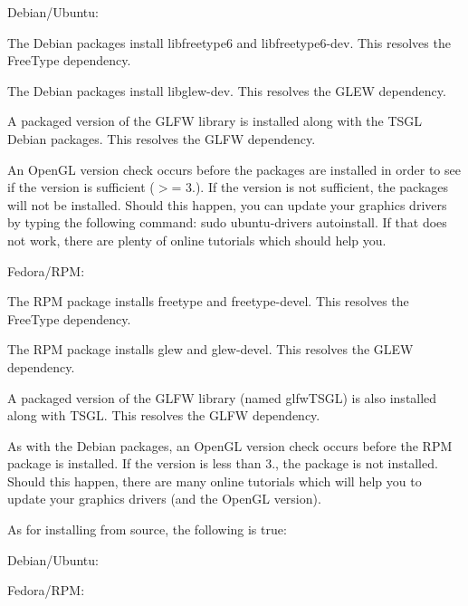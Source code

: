 \begin{DoxyItemize}
\item Debian/\-Ubuntu\-:
\begin{DoxyItemize}
\item The Debian packages install libfreetype6 and libfreetype6-\/dev. This resolves the Free\-Type dependency.
\item The Debian packages install libglew-\/dev. This resolves the G\-L\-E\-W dependency.
\item A packaged version of the G\-L\-F\-W library is installed along with the T\-S\-G\-L Debian packages. This resolves the G\-L\-F\-W dependency.
\item An Open\-G\-L version check occurs before the packages are installed in order to see if the version is sufficient ($>$= 3.). If the version is not sufficient, the packages will not be installed. Should this happen, you can update your graphics drivers by typing the following command\-: {\ttfamily sudo ubuntu-\/drivers autoinstall}. If that does not work, there are plenty of online tutorials which should help you.
\end{DoxyItemize}
\item Fedora/\-R\-P\-M\-:
\begin{DoxyItemize}
\item The R\-P\-M package installs freetype and freetype-\/devel. This resolves the Free\-Type dependency.
\item The R\-P\-M package installs glew and glew-\/devel. This resolves the G\-L\-E\-W dependency.
\item A packaged version of the G\-L\-F\-W library (named glfw\-T\-S\-G\-L) is also installed along with T\-S\-G\-L. This resolves the G\-L\-F\-W dependency.
\item As with the Debian packages, an Open\-G\-L version check occurs before the R\-P\-M package is installed. If the version is less than 3., the package is not installed. Should this happen, there are many online tutorials which will help you to update your graphics drivers (and the Open\-G\-L version).
\end{DoxyItemize}
\end{DoxyItemize}

As for installing from source, the following is true\-:


\begin{DoxyItemize}
\item Debian/\-Ubuntu\-:
\begin{DoxyItemize}
\item 
\end{DoxyItemize}
\item Fedora/\-R\-P\-M\-:
\begin{DoxyItemize}
\item 
\end{DoxyItemize}
\end{DoxyItemize}

